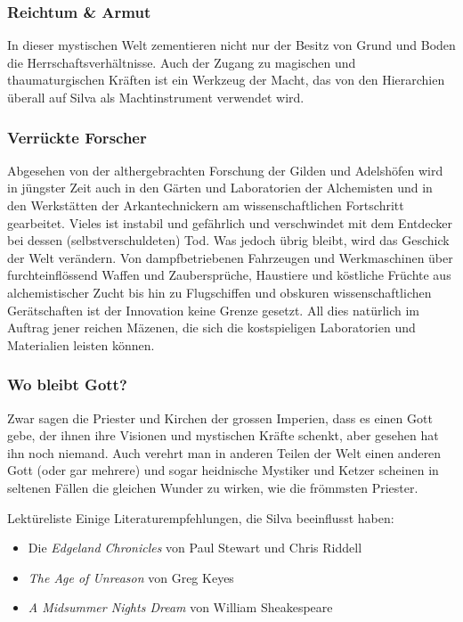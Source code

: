 \documentclass[10pt,twoside,twocolumn,openany]{book}
\begin{document}
\subsubsection{Reichtum \& Armut}
In dieser mystischen Welt zementieren nicht nur der Besitz von Grund und Boden die Herrschaftsverhältnisse. Auch der Zugang zu magischen und thaumaturgischen Kräften ist ein Werkzeug der Macht, das von den Hierarchien überall auf Silva als Machtinstrument verwendet wird.


\subsubsection{Verrückte Forscher}
Abgesehen von der althergebrachten Forschung der Gilden und Adelshöfen wird in jüngster Zeit auch in den Gärten und Laboratorien der Alchemisten und in den Werkstätten der Arkantechnickern am wissenschaftlichen Fortschritt gearbeitet. Vieles ist instabil und gefährlich und verschwindet mit dem Entdecker bei dessen (selbstverschuldeten) Tod. Was jedoch übrig bleibt, wird das Geschick der Welt verändern. Von dampfbetriebenen Fahrzeugen und Werkmaschinen über furchteinflössend Waffen und Zaubersprüche, Haustiere und köstliche Früchte aus alchemistischer Zucht bis hin zu Flugschiffen und obskuren wissenschaftlichen Gerätschaften ist der Innovation keine Grenze gesetzt. All dies natürlich im Auftrag jener reichen Mäzenen, die sich die kostspieligen Laboratorien und Materialien leisten können.

\subsubsection{Wo bleibt Gott?}
Zwar sagen die Priester und Kirchen der grossen Imperien, dass es einen Gott gebe, der ihnen ihre Visionen und mystischen Kräfte schenkt, aber gesehen hat ihn noch niemand. Auch verehrt man in anderen Teilen der Welt einen anderen Gott (oder gar mehrere) und sogar heidnische Mystiker und Ketzer scheinen in seltenen Fällen die gleichen Wunder zu wirken, wie die frömmsten Priester.

\begin{table}[h]
	\begin{commentbox}{Lektüreliste}
		Einige Literaturempfehlungen, die Silva beeinflusst haben:
		\begin{itemize}
			\item Die \emph{Edgeland Chronicles} von Paul Stewart und Chris Riddell
			\item \emph{The Age of Unreason} von Greg Keyes
			\item \emph{A Midsummer Nights Dream} von William Sheakespeare
		\end{itemize}
	\end{commentbox}
\end{table}
\end{document}
